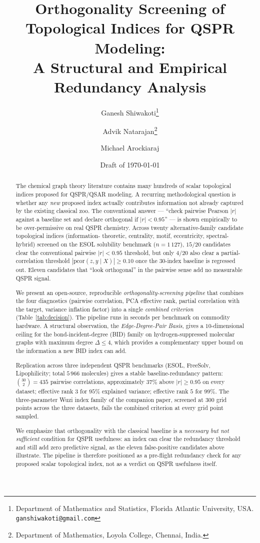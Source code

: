 \documentclass[11pt,a4paper]{article}
\title{\bfseries Orthogonality Screening of Topological Indices for QSPR Modeling:\\ A Structural and Empirical Redundancy Analysis}
\author{
  Ganesh Shiwakoti\thanks{Department of Mathematics and Statistics, Florida Atlantic University, USA. \texttt{ganshiwakoti@gmail.com}} \and
  Advik Natarajan\thanks{Department of Mathematics, Loyola College, Chennai, India.} \and
  Michael Arockiaraj\footnotemark[2]
}
\date{Draft of \today}
\theoremstyle{definition}
\begin{document}
\maketitle

\begin{abstract}
The chemical graph theory literature contains many hundreds of
scalar topological indices proposed for QSPR/QSAR modeling. A
recurring methodological question is whether any \emph{new}
proposed index actually contributes information not already
captured by the existing classical zoo. The conventional answer
--- ``check pairwise Pearson $|r|$ against a baseline set and
declare orthogonal if $|r| < 0.95$'' --- is shown empirically to
be over-permissive on real QSPR chemistry. Across twenty
alternative-family candidate topological indices (information-
theoretic, centrality, motif, eccentricity, spectral-hybrid)
screened on the ESOL solubility benchmark ($n = 1\,127$), $15 / 20$
candidates clear the conventional pairwise $|r| < 0.95$ threshold,
but only $4 / 20$ also clear a partial-correlation threshold
$|\mathrm{pcor}(z, y \mid X)| \ge 0.10$ once the $30$-index baseline
is regressed out. Eleven candidates that ``look orthogonal'' in the
pairwise sense add no measurable QSPR signal.

We present an open-source, reproducible
\emph{orthogonality-screening pipeline} that combines the four
diagnostics (pairwise correlation, PCA effective rank, partial
correlation with the target, variance inflation factor) into a
single \emph{combined criterion} (Table~\ref{tab:decision}). The
pipeline runs in seconds per benchmark on commodity hardware.
A structural observation, the \emph{Edge-Degree-Pair Basis}, gives
a $10$-dimensional ceiling for the bond-incident-degree (BID)
family on hydrogen-suppressed molecular graphs with maximum degree
$\Delta\le 4$, which provides a complementary upper bound on the
information a new BID index can add.

Replication across three independent QSPR benchmarks (ESOL,
FreeSolv, Lipophilicity; total $5\,966$ molecules) gives a stable
baseline-redundancy pattern: $\binom{30}{2} = 435$ pairwise
correlations, approximately $37\%$ above $|r| \ge 0.95$ on every
dataset; effective rank $3$ for $95\%$ explained variance; effective
rank $5$ for $99\%$. The three-parameter Wuzi index family of the
companion paper, screened at $300$ grid points across the three
datasets, fails the combined criterion at every grid point sampled.

We emphasize that orthogonality with the classical baseline is a
\emph{necessary but not sufficient} condition for QSPR usefulness:
an index can clear the redundancy threshold and still add zero
predictive signal, as the eleven false-positive candidates above
illustrate. The pipeline is therefore positioned as a pre-flight
redundancy check for any proposed scalar topological index, not as
a verdict on QSPR usefulness itself.


\end{abstract}
\end{document}
